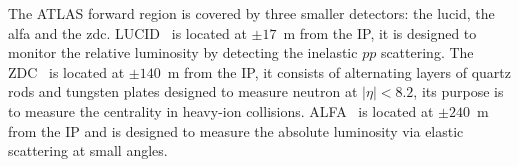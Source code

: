 The ATLAS forward region is covered by three smaller detectors: the \gls{lucid},
the \gls{alfa} and the \gls{zdc}. LUCID~\cite{ForwardDetectors} is located at
$\pm 17$~m from the IP, it is designed to monitor the relative luminosity by
detecting the inelastic $pp$ scattering. The ZDC~\cite{ForwardDetectors} is
located at $\pm 140$~m from the IP, it consists of alternating layers of quartz
rods and tungsten plates designed to measure neutron at $|\eta| < 8.2$, its
purpose is to measure the centrality in heavy-ion
collisions. ALFA~\cite{ForwardDetectors} is located at $\pm 240$~m from the IP
and is designed to measure the absolute luminosity via elastic scattering at
small angles.

